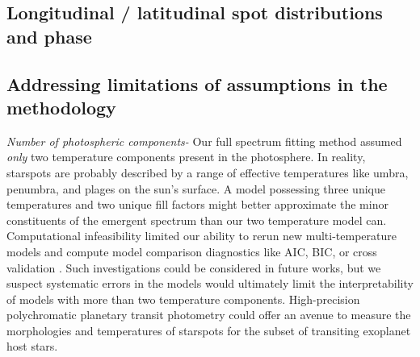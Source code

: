 \documentclass[twocolumn]{emulateapj}%
\begin{document}
\subsection{Longitudinal / latitudinal spot distributions and phase}


\subsection{Addressing limitations of assumptions in the methodology}

\emph{Number of photospheric components-}  Our full spectrum fitting method assumed \emph{only} two temperature components present in the photosphere.  In reality, starspots are probably described by a range of effective temperatures like umbra, penumbra, and plages on the sun's surface.  A model possessing three unique temperatures and two unique fill factors might better approximate the minor constituents of the emergent spectrum than our two temperature model can.  Computational infeasibility limited our ability to rerun new multi-temperature models and compute model comparison diagnostics like AIC, BIC, or cross validation \citep{ivezic14}.  Such investigations could be considered in future works, but we suspect systematic errors in the models would ultimately limit the interpretability of models with more than two temperature components.  High-precision polychromatic planetary transit photometry could offer an avenue to measure the morphologies and temperatures of starspots for the subset of transiting exoplanet host stars.
\end{document}
